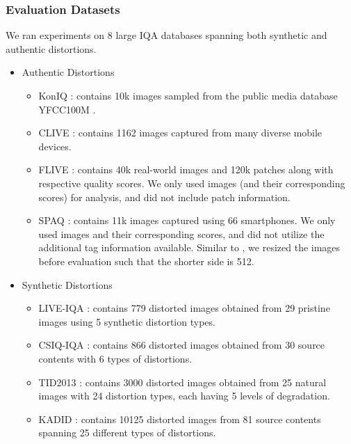 \documentclass[journal]{IEEEtran}
\begin{document}
\subsubsection*{\textbf{Evaluation Datasets}}
We ran experiments on 8 large IQA databases spanning both synthetic and authentic distortions. 
\begin{itemize}
    \item Authentic Distortions
    \begin{itemize}
        \item KonIQ \cite{hosu2020koniq} : contains 10k images sampled from the public media database YFCC100M \cite{thomee2016yfcc100m}.
        \item CLIVE \cite{ghadiyaram2015massive} : contains 1162 images captured from many diverse mobile devices.
        \item FLIVE \cite{ying2019patches} : contains 40k real-world images and 120k patches along with respective quality scores. We only used images (and their corresponding scores) for analysis, and did not include patch information. 
        \item SPAQ \cite{fang2020perceptual} : contains 11k images captured using 66 smartphones. We only used images and their corresponding scores, and did not utilize the additional tag information available. Similar to \cite{fang2020perceptual}, we resized the images before evaluation such that the shorter side is 512.
    \end{itemize}
    \item Synthetic Distortions
    \begin{itemize}
        \item LIVE-IQA \cite{sheikh2006statistical} : contains 779 distorted images obtained from 29 pristine images using 5 synthetic distortion types.
        \item CSIQ-IQA \cite{larson2010most} : contains 866 distorted images obtained from 30 source contents with 6 types of distortions.
        \item TID2013 \cite{ponomarenko2015image} : contains 3000 distorted images obtained from 25 natural images with 24 distortion types, each having 5 levels of degradation.
        \item KADID \cite{lin2019kadid} : contains 10125 distorted images from 81 source contents spanning 25 different types of distortions.
    \end{itemize}
\end{itemize}
\end{document}
